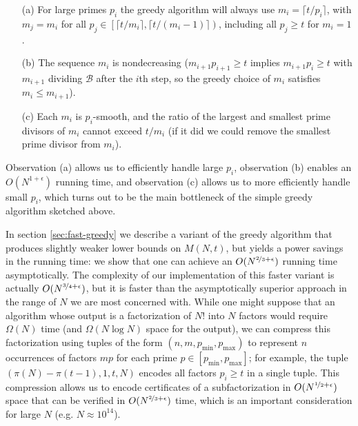 \documentclass[12pt,a4paper,reqno]{amsart}
\numberwithin{equation}{section}
\theoremstyle{plain}
\theoremstyle{definition}
\newcommand\tuple{{\mathcal B}}
\begin{document}
\begin{itemize}
\setlength{\itemsep}{6pt}
\item[(a)] For large primes $p_i$ the greedy algorithm will always use $m_i=\lceil t/p_i\rceil$, with $m_j=m_i$ for all $p_j\in \left[\lceil t/m_i\rceil,\lceil t/(m_i-1)\rceil\right)$, including all $p_j\ge t$ for $m_i=1$.
\item[(b)] The sequence $m_i$ is nondecreasing ($m_{i+1}p_{i+1}\ge t$ implies $m_{i+1}p_i\ge t$ with $m_{i+1}$ dividing $\tuple$ after the $i$th step, so the greedy choice of $m_i$ satisfies $m_i\le m_{i+1}$).
\item[(c)] Each $m_i$ is $p_i$-smooth, and the ratio of the largest and smallest prime divisors of $m_i$ cannot exceed $t/m_i$ (if it did we could remove the smallest prime divisor from $m_i$).
\end{itemize}

Observation (a) allows us to efficiently handle large $p_i$, observation (b) enables an $O(N^{1+\epsilon})$ running time, and observation (c) allows us to more efficiently handle small $p_i$, which turns out to be the main bottleneck of the simple greedy algorithm sketched above.

In section \ref{sec:fast-greedy} we describe a variant of the greedy algorithm that produces slightly weaker lower bounds on $M(N,t)$, but yields a power savings in the running time: we show that one can achieve an $O(N^{\nicefrac{2}{3}+\epsilon})$ running time asymptotically. The complexity of our implementation of this faster variant is actually $O(N^{\nicefrac{3}{4}+\epsilon})$, but it is faster than the asymptotically superior approach in the range of $N$ we are most concerned with.  While one might suppose that an algorithm whose output is a factorization of $N!$ into $N$ factors would require $\Omega(N)$ time (and $\Omega(N\log N)$ space for the output), we can compress this factorization using tuples of the form $(n,m,p_{\min},p_{\max})$ to represent $n$ occurrences of factors $mp$ for each prime $p\in [p_{\min},p_{\max}]$; for example, the tuple $(\pi(N)-\pi(t-1),1,t,N)$ encodes all factors $p_i\ge t$ in a single tuple.  This compression allows us to encode certificates of a subfactorization in $O(N^{\nicefrac{1}{2}+\epsilon})$ space that can be verified in $O(N^{\nicefrac{2}{3}+\epsilon})$ time, which is an important consideration for large $N$ (e.g. $N\approx 10^{14}$).
\end{document}
